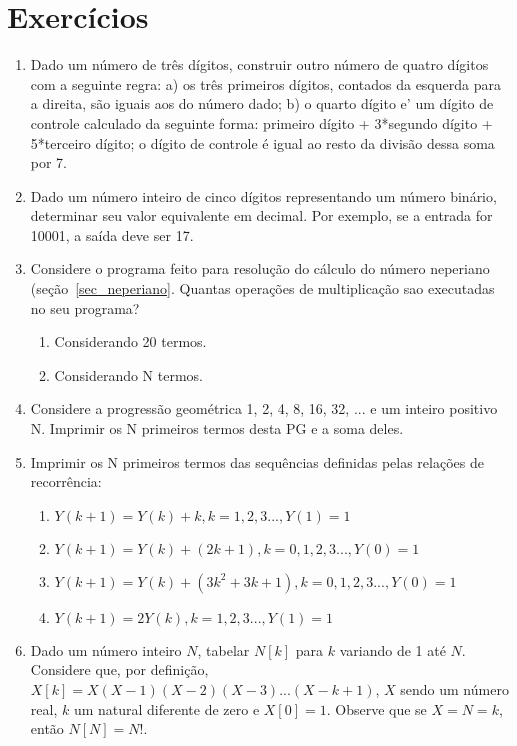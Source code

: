 \section{Exercícios}

\begin{enumerate}

\item Dado um número de três dígitos, construir outro número de quatro
   dígitos com a seguinte regra: a) os três primeiros  dígitos,
   contados da esquerda para a direita, são iguais aos do número dado;
   b) o quarto dígito e' um dígito de controle calculado da seguinte forma:
   primeiro dígito + 3*segundo dígito + 5*terceiro dígito; o dígito de
   controle é igual ao resto da divisão dessa soma por 7.

\item Dado um  número inteiro  de  cinco dígitos  representando um  número
   binário, determinar seu valor equivalente em decimal. Por exemplo, se a
   entrada for 10001, a saída deve ser 17.

\item Considere o programa feito para resolução do cálculo do número neperiano
      (seção~\ref{sec_neperiano}.
     Quantas operações de multiplicação sao executadas no seu programa?
\begin{enumerate}
\item Considerando 20 termos.
\item Considerando N termos.
\end{enumerate}

\item Considere a progressão geométrica 1, 2, 4, 8, 16, 32, ... e um inteiro 
   positivo N. Imprimir os N primeiros termos desta PG e a soma deles.

\item Imprimir os N primeiros termos das sequências definidas pelas relações
   de recorrência:

\begin{enumerate}
\item $Y(k+1) = Y(k) + k, k = 1,2,3..., Y(1)=1$
\item $Y(k+1) = Y(k) + (2k+1), k = 0,1,2,3..., Y(0)=1$
\item $Y(k+1) = Y(k) + (3k^2 + 3k + 1), k = 0,1,2,3..., Y(0)=1$
\item $Y(k+1) = 2Y(k), k = 1,2,3..., Y(1)=1$
\end{enumerate}

\item Dado um número  inteiro $N$,  tabelar $N[k]$  para $k$  variando de  1 até
     $N$.  Considere  que,  por definição,  $X[k]=X(X-1)(X-2)(X-3)...(X-k+1)$,  
     $X$
     sendo um número  real, $k$ um natural diferente de  zero e $X[0]=1$. 
     Observe que se $X=N=k$, então $N[N]=N!$. 


\end{enumerate}
